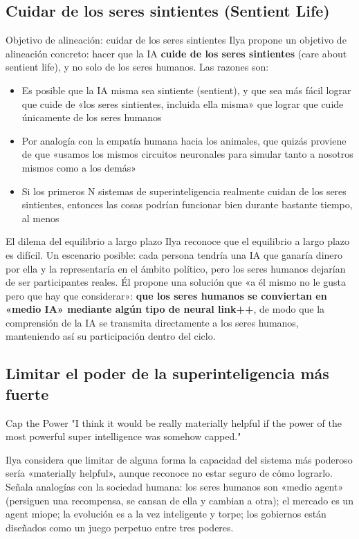 \documentclass[a4paper]{article}
\begin{document}
\subsection{Cuidar de los seres sintientes (Sentient Life)}

\begin{importantbox}{Objetivo de alineación: cuidar de los seres sintientes}
Ilya propone un objetivo de alineación concreto: hacer que la IA \textbf{cuide de los seres sintientes} (care about sentient life), y no solo de los seres humanos. Las razones son:
\begin{itemize}
    \item Es posible que la IA misma sea sintiente (sentient), y que sea más fácil lograr que cuide de «los seres sintientes, incluida ella misma» que lograr que cuide únicamente de los seres humanos
    \item Por analogía con la empatía humana hacia los animales, que quizás proviene de que «usamos los mismos circuitos neuronales para simular tanto a nosotros mismos como a los demás»
    \item Si los primeros N sistemas de superinteligencia realmente cuidan de los seres sintientes, entonces las cosas podrían funcionar bien durante bastante tiempo, al menos
\end{itemize}
\end{importantbox}

\begin{warningbox}{El dilema del equilibrio a largo plazo}
Ilya reconoce que el equilibrio a largo plazo es difícil. Un escenario posible: cada persona tendría una IA que ganaría dinero por ella y la representaría en el ámbito político, pero los seres humanos dejarían de ser participantes reales. Él propone una solución que «a él mismo no le gusta pero que hay que considerar»: \textbf{que los seres humanos se conviertan en «medio IA» mediante algún tipo de neural link++}, de modo que la comprensión de la IA se transmita directamente a los seres humanos, manteniendo así su participación dentro del ciclo.
\end{warningbox}

\subsection{Limitar el poder de la superinteligencia más fuerte}

\begin{importantbox}{Cap the Power}
"I think it would be really materially helpful if the power of the most powerful super intelligence was somehow capped."

Ilya considera que limitar de alguna forma la capacidad del sistema más poderoso sería «materially helpful», aunque reconoce no estar seguro de cómo lograrlo. Señala analogías con la sociedad humana: los seres humanos son «medio agent» (persiguen una recompensa, se cansan de ella y cambian a otra); el mercado es un agent miope; la evolución es a la vez inteligente y torpe; los gobiernos están diseñados como un juego perpetuo entre tres poderes.
\end{importantbox}
\end{document}
